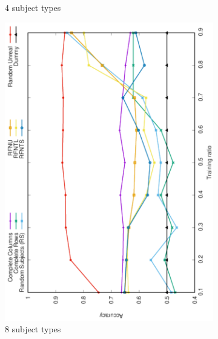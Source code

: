 \documentclass[10pt, conference, compsocconf]{IEEEtran}
\begin{document}
\begin{figure}
\begin{subfigure}[b]{0.4\linewidth}
        \caption{4 subject types}
\end{subfigure}
\begin{subfigure}[b]{0.4\linewidth}
        \includegraphics[width=0.8\columnwidth, angle=-90]{data/results/means_of_results/ALS-Bias/Synthetic/synthetic_subject_types/ALS-Bias-8-types.pdf}
        \caption{8 subject types}
\end{subfigure}
\begin{subfigure}[b]{0.4\linewidth}

\end{subfigure}
\end{figure}
\end{document}
